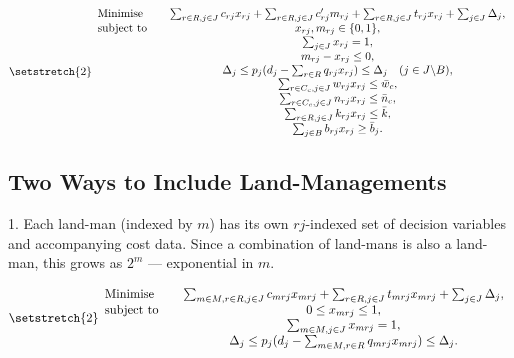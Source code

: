 \documentclass[12pt,a4paper,twoside]{article}
\begin{document}
\everymath{\displaystyle}
\begin{equation}
	{\setstretch{2}
	\begin{array}{l c}
	\text{Minimise} \quad & \sum_{r \in R, j \in J} c_{rj} x_{rj}
				    + \sum_{r \in R, j \in J} c'_{rj} m_{rj}
					+ \sum_{r \in R, j \in J} t_{rj} x_{rj}
					+ \sum_{j \in J} \Delta_j, \\

	\text{subject to} \quad
	& x_{rj}, m_{rj} \in \{0, 1\}, \\
	& \sum_{j \in J} x_{rj}  = 1, \\
	& m_{rj} - x_{rj} \leq 0, \\
	& \Delta_j \leq p_j (d_j - \sum_{r \in R} q_{rj} x_{rj}) \leq \Delta_j \quad (j \in J \backslash B), \\
	& \sum_{r \in C_c, j \in J} w_{rj} x_{rj} \leq \bar{w}_c, \\
	& \sum_{r \in C_c, j \in J} n_{rj} x_{rj} \leq \bar{n}_c, \\
	& \sum_{r \in R, j \in J} k_{rj} x_{rj} \leq \bar{k}, \\
	& \sum_{j \in B} b_{rj} x_{rj} \geq \bar{b}_j.

	\end{array}}
\end{equation}
\everymath{}

\newpage

\subsection{Two Ways to Include Land-Managements}\label{subsec:comparison}

1. Each land-man (indexed by $m$) has its own $rj$-indexed set of decision variables and accompanying cost data. Since a combination of land-mans is also a land-man, this grows as $2^m$ --- exponential in $m$.

\everymath{\displaystyle}
\begin{equation}
	{\setstretch{2}
	\begin{array}{l c}
	\text{Minimise} \quad & \sum_{m \in M, r \in R, j \in J} c_{mrj} x_{mrj}
					+ \sum_{r \in R, j \in J} t_{mrj} x_{mrj}
					+ \sum_{j \in J} \Delta_j, \\

	\text{subject to} \quad
	& 0 \leq x_{mrj} \leq 1, \\
	& \sum_{m \in M, j \in J} x_{mrj}  = 1, \\
	& \Delta_j \leq p_j (d_j - \sum_{m \in M, r \in R} q_{mrj} x_{mrj}) \leq \Delta_j.

	\end{array}}
\end{equation}
\everymath{}
\end{document}
